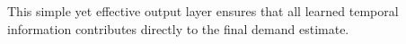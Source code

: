 \documentclass{article}
\begin{document}
This simple yet effective output layer ensures that all learned temporal information contributes directly to the final demand estimate.








\end{document}
